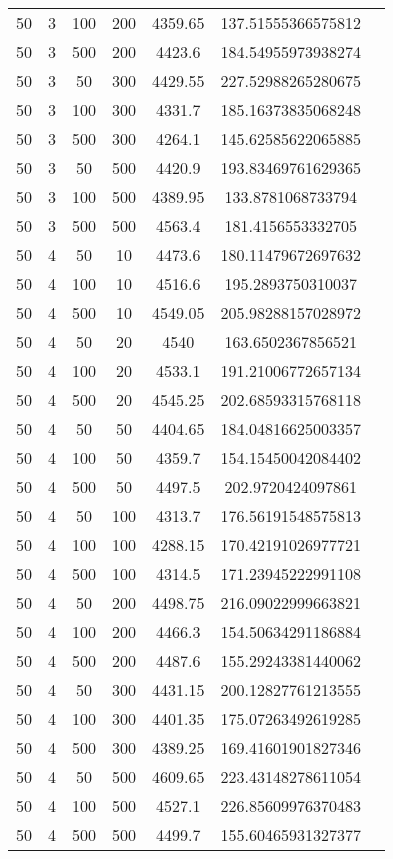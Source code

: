 {\begin{longtabu}{S
S
S
S
S
S[round-mode=places,round-precision=0]
S[round-mode=places,round-precision=0]}
50 & 3 & 100 & 200 & 4359.65 & 137.51555366575812 \\
50 & 3 & 500 & 200 & 4423.6 & 184.54955973938274 \\
50 & 3 & 50 & 300 & 4429.55 & 227.52988265280675 \\
50 & 3 & 100 & 300 & 4331.7 & 185.16373835068248 \\
50 & 3 & 500 & 300 & 4264.1 & 145.62585622065885 \\
50 & 3 & 50 & 500 & 4420.9 & 193.83469761629365 \\
50 & 3 & 100 & 500 & 4389.95 & 133.8781068733794 \\
50 & 3 & 500 & 500 & 4563.4 & 181.4156553332705 \\
50 & 4 & 50 & 10 & 4473.6 & 180.11479672697632 \\
50 & 4 & 100 & 10 & 4516.6 & 195.2893750310037 \\
50 & 4 & 500 & 10 & 4549.05 & 205.98288157028972 \\
50 & 4 & 50 & 20 & 4540 & 163.6502367856521 \\
50 & 4 & 100 & 20 & 4533.1 & 191.21006772657134 \\
50 & 4 & 500 & 20 & 4545.25 & 202.68593315768118 \\
50 & 4 & 50 & 50 & 4404.65 & 184.04816625003357 \\
50 & 4 & 100 & 50 & 4359.7 & 154.15450042084402 \\
50 & 4 & 500 & 50 & 4497.5 & 202.9720424097861 \\
50 & 4 & 50 & 100 & 4313.7 & 176.56191548575813 \\
50 & 4 & 100 & 100 & 4288.15 & 170.42191026977721 \\
50 & 4 & 500 & 100 & 4314.5 & 171.23945222991108 \\
50 & 4 & 50 & 200 & 4498.75 & 216.09022999663821 \\
50 & 4 & 100 & 200 & 4466.3 & 154.50634291186884 \\
50 & 4 & 500 & 200 & 4487.6 & 155.29243381440062 \\
50 & 4 & 50 & 300 & 4431.15 & 200.12827761213555 \\
50 & 4 & 100 & 300 & 4401.35 & 175.07263492619285 \\
50 & 4 & 500 & 300 & 4389.25 & 169.41601901827346 \\
50 & 4 & 50 & 500 & 4609.65 & 223.43148278611054 \\
50 & 4 & 100 & 500 & 4527.1 & 226.85609976370483 \\
50 & 4 & 500 & 500 & 4499.7 & 155.60465931327377 \\

\end{longtabu}}
